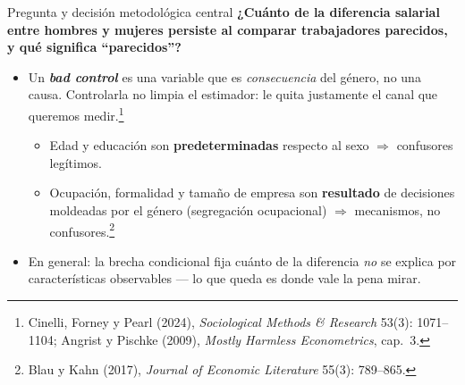 \documentclass[aspectratio=169]{beamer}
\begin{document}
\begin{frame}{Pregunta y decisión metodológica central}
  \textbf{¿Cuánto de la diferencia salarial entre hombres y mujeres persiste al
  comparar trabajadores parecidos, y qué significa ``parecidos''?}
  \vspace{0.6em}
  \begin{itemize}
    
    \item Un \textbf{\emph{bad control}} es una variable que es \emph{consecuencia}
      del género, no una causa. Controlarla no limpia el estimador: le
      quita justamente el canal que queremos medir.\footnote{\scriptsize Cinelli,
        Forney y Pearl (2024), \textit{Sociological Methods \& Research} 53(3):
        1071--1104; Angrist y Pischke (2009), \textit{Mostly Harmless
        Econometrics}, cap.\ 3.}
      \begin{itemize}
        \item Edad y educación son \textbf{predeterminadas} respecto al sexo
          $\Rightarrow$ confusores legítimos.
        \item Ocupación, formalidad y tamaño de empresa son \textbf{resultado} de
          decisiones moldeadas por el género (segregación ocupacional)
          $\Rightarrow$ mecanismos, no confusores.\footnote{\scriptsize Blau y Kahn
            (2017), \textit{Journal of Economic Literature} 55(3): 789--865.}
      \end{itemize}
    \item En general: la brecha condicional fija cuánto de la diferencia
      \emph{no} se explica por características observables --- lo que queda es
      donde vale la pena mirar.
  \end{itemize}
\end{frame}
\end{document}

